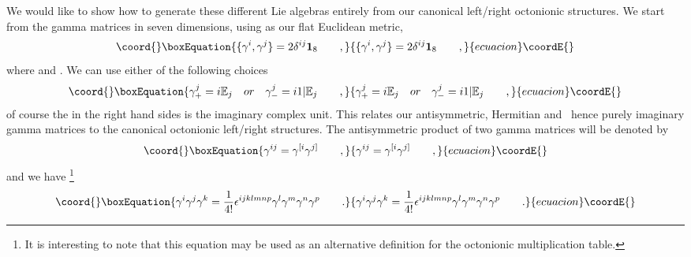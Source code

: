 \documentclass[a4paper,12pt]{book}
\begin{document}
We would like to show how to generate these different Lie algebras entirely
from our canonical left/right octonionic structures. We start from the \coordHE{} gamma matrices \coordHE{} in seven dimensions,
using \coordHE{} as our flat Euclidean metric, 
\begin{equation}\coord{}\boxEquation{
\{\gamma ^{i},\gamma ^{j}\}=2\delta ^{ij}\mathbf{1}_{8}\qquad ,
}{
\{\gamma ^{i},\gamma ^{j}\}=2\delta ^{ij}\mathbf{1}_{8}\qquad ,
}{ecuacion}\coordE{}\end{equation}
where \coordHE{} and \coordHE{}. We
can use either of the following choices 
\begin{equation}\coord{}\boxEquation{
\gamma _{+}^{j}=i\Bbb{E}_{j}\quad or\quad \gamma _{-}^{j}=i1|\Bbb{E}
_{j}\qquad ,  \label{cliffo}
}{
\gamma _{+}^{j}=i\Bbb{E}_{j}\quad or\quad \gamma _{-}^{j}=i1|\Bbb{E}
_{j}\qquad ,  }{ecuacion}\coordE{}\end{equation}
of course the \coordHE{} in the right hand sides is the imaginary complex unit.
This relates our antisymmetric, Hermitian and \ hence purely imaginary gamma
matrices to the canonical octonionic left/right structures. The
antisymmetric product of two gamma matrices will be denoted by 
\begin{equation}\coord{}\boxEquation{
\gamma ^{ij}=\gamma ^{[i}\gamma ^{j]}\qquad ,
}{
\gamma ^{ij}=\gamma ^{[i}\gamma ^{j]}\qquad ,
}{ecuacion}\coordE{}\end{equation}
and we have \footnote{%
It is interesting to note that this equation may be used as an alternative
definition for the octonionic multiplication table.} 
\begin{equation}\coord{}\boxEquation{
\gamma ^{i}\gamma ^{j}\gamma ^{k}=\frac{1}{4!}\epsilon ^{ijklmnp}\gamma
^{l}\gamma ^{m}\gamma ^{n}\gamma ^{p}\qquad .
}{
\gamma ^{i}\gamma ^{j}\gamma ^{k}=\frac{1}{4!}\epsilon ^{ijklmnp}\gamma
^{l}\gamma ^{m}\gamma ^{n}\gamma ^{p}\qquad .
}{ecuacion}\coordE{}\end{equation}
\end{document}
